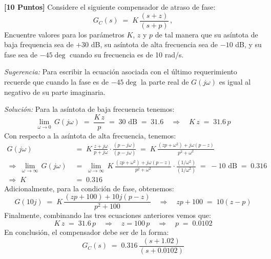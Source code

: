 \documentclass[ a4paper, twoside, 11pt]{article}
\begin{document}
\begin{problem}
\textbf{[10 Puntos]} Considere el siguiente compensador de atraso de fase: 
\[
G_C(s) \; = \; K \, \frac{(s+z)}{(s+p)} \, ,
\]
Encuentre valores para los par\'ametros $K$, $z$ y $p$ de tal manera que su as\'intota de baja frequencia sea de $+30$ dB, su as\'intota de alta frecuencia sea de $-10$ dB, y su fase sea de $-45\deg$ cuando su frecuencia es de 10 rad/s. 

\emph{Sugerencia:} Para escribir la ecuaci\'on asociada con el \'ultimo requerimiento recuerde que cuando la fase es de $-45\deg$ la parte real de $G( j \omega )$ es igual al negativo de su parte imaginaria. 

\emph{Soluci\'on:} Para la as\'intota de baja frecuencia tenemos: 
\[
\lim_{\omega \rightarrow 0} \, G( j\omega )
\; = \; \frac{K \, z}{p} \; = \; 30 \text{ dB}
\; = \; 31.6 \quad \Longrightarrow \quad
K \, z \; = \; 31.6 \, p
\]
Con respecto a la as\'intota de alta frecuencia, tenemos: 
\begin{align*}
G( j\omega ) \;
& = \; K \, \frac{z + j\omega}{p + j\omega} \cdot \frac{(p-j\omega)}{(p-j\omega)}
\; = \; K \, \frac{(zp + \omega^2) + j \omega (p-z)}{p^2 + \omega^2} \\[2ex]
\Longrightarrow \;
\lim_{\omega \rightarrow \infty} \, G( j\omega ) \;
& = \; \lim_{\omega \rightarrow \infty} \, K \, \frac{(zp + \omega^2) + j \omega (p-z)}{p^2 + \omega^2} \cdot \frac{(1/\omega^2)}{(1/\omega^2)} \; = \; -10 \text{ dB} \; = \; 0.316 \\[2ex]
\Longrightarrow \; K \; & = \; 0.316
\end{align*}
Adicionalmente, para la condici\'on de fase, obtenemos: 
\[
G(10j) \; = \; K \, \frac{(zp + 100) + 10j(p-z)}{p^2 + 100} \quad \Longrightarrow \quad
zp + 100 \; = \; 10(z-p)
\]
Finalmente, combinando las tres ecuaciones anteriores vemos que: 
\[
K \, z \; = \; 31.6 \, p
\quad \Longrightarrow \quad
z = 100 \, p
\quad \Longrightarrow \quad
p \; = \; 0.0102
\]
En conclusi\'on, el compensador debe ser de la forma: 
\[
G_C(s) \; = \; 0.316 \, \frac{(s+1.02)}{(s+0.0102)}
\]

\end{problem}
\vspace{\baselineskip}
\end{document}
